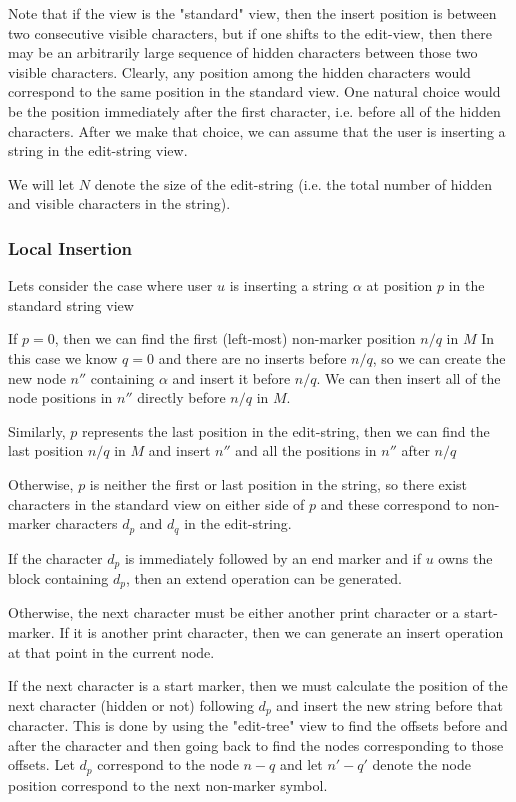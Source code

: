 \documentclass{amsart}
\begin{document}
Note that if the view is the "standard" view, then the insert position is between
two consecutive visible characters, but if one shifts to the edit-view, then
there may be an arbitrarily large sequence of hidden characters between those
two visible characters. Clearly, any position among the hidden characters
would correspond to the same position in the standard view. One natural choice would
be the position immediately after the first character, i.e. before all of the hidden
characters.  After we make that choice, we can assume that the user is inserting
a string in the edit-string view.

We will let $N$ denote the size of the edit-string (i.e. the total number of
hidden and visible characters in the string).


\subsubsection{Local Insertion}
Lets consider the case where user $u$ 
is inserting a string $\alpha$ at position $p$ in the standard string view


If $p=0$, then we can find the first (left-most) non-marker position $n/q$ in $M$
In this case we know $q=0$ and there are no inserts before $n/q$, so we
can create the new node $n''$ containing $\alpha$ and insert it before $n/q$.
We can then insert all of the node positions in $n''$ directly before $n/q$ in $M$.

Similarly, $p$ represents the last position in the edit-string, then we can
find the last position $n/q$ in $M$ and insert $n''$ and all the positions
in $n''$ after $n/q$

Otherwise, $p$ is neither the first or last position in the string, so there
exist characters in the standard view on either side of $p$ and these correspond
to non-marker characters $d_p$ and $d_q$ in the edit-string.

If the character $d_p$ is immediately followed by an end marker 
and if $u$ owns the block containing $d_p$, then an extend operation 
can be generated.

Otherwise, the next character must be either another print character or a
start-marker.  If it is another print character, then we can generate an insert
operation at that point in the current node.

If the next character is a start marker, then we must calculate the position
of the next character (hidden or not) following $d_p$ and insert the new
string before that character. This is done 
by using the "edit-tree" view to find the offsets before and after the
character and then going back to find the nodes corresponding to those
offsets. Let $d_p$ correspond to the node $n-q$ and let $n'-q'$ denote
the node position correspond to the next non-marker symbol.
\end{document}
